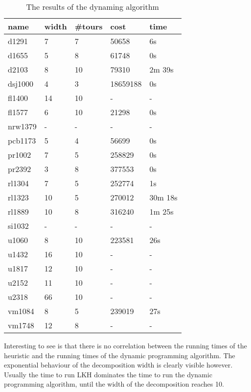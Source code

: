 \documentclass[titlepage, 12pt]{article}
\begin{document}
    \begin{table}
    \begin{tabular}{l l l l l}
        name    & width & \#tours   & cost      & time \\ \hline
        d1291   & 7     & 7         & 50658     & 6s \\
        d1655   & 5     & 8         & 61748     & 0s \\
        d2103   & 8     & 10        & 79310     & 2m 39s \\
        dsj1000 & 4     & 3         & 18659188  & 0s \\
        fl1400  & 14    & 10        & -         & - \\
        fl1577  & 6     & 10        & 21298     & 0s \\
        nrw1379 & -     & -         & -         & - \\
        pcb1173 & 5     & 4         & 56699     & 0s \\
        pr1002  & 7     & 5         & 258829    & 0s \\
        pr2392  & 3     & 8         & 377553    & 0s \\
        rl1304  & 7     & 5         & 252774    & 1s \\
        rl1323  & 10    & 5         & 270012    & 30m 18s \\
        rl1889  & 10    & 8         & 316240    & 1m 25s \\
        si1032  & -     & -         & -         & - \\
        u1060   & 8     & 10        & 223581    & 26s \\
        u1432   & 16    & 10        & -         & - \\
        u1817   & 12    & 10        & -         & - \\
        u2152   & 11    & 10        & -         & - \\
        u2318   & 66    & 10        & -         & - \\
        vm1084  & 8     & 5         & 239019    & 27s \\
        vm1748  & 12    & 8         & -         & - \\
    \end{tabular}
    \caption{The results of the dynaming algorithm}
    \label{table:tsp-dp}
    \end{table}

    Interesting to see is that there is no correlation between the running times of the heuristic
    and the running times of the dynamic programming algorithm. The exponential behaviour of the
    decomposition width is clearly visible however. Usually the time to run LKH dominates the time
    to run the dynamic programming algorithm, until the width of the decomposition reaches 10.
\end{document}
